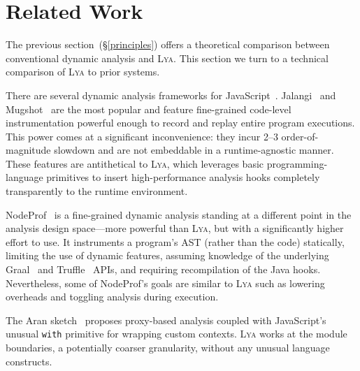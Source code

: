 \documentclass[letterpaper,twocolumn,10pt]{article}
\newcommand{\heading}[1]{\vspace{2pt}\noindent\textbf{#1}\enspace}
\newcommand{\ttt}[1]{\texttt{#1}}
\newcommand{\sx}[1]{(\S\ref{#1})}
\newcommand{\sys}{{\scshape Lya}\xspace}
\begin{document}
\section{Related Work}
\label{rw}

The previous section~\sx{principles} offers a theoretical comparison between conventional dynamic analysis and \sys.
This section we turn to a technical comparison of \sys to prior systems.

There are several dynamic analysis frameworks for JavaScript~\cite{javascript1, javascript2, javascript3, mugshot, jalangi}.
Jalangi~\cite{jalangi} and Mugshot~\cite{mugshot} are the most popular and feature fine-grained code-level instrumentation powerful enough to record and replay entire program executions.
This power comes at a significant inconvenience: %
  they incur 2--3 order-of-magnitude slowdown and are not embeddable in a runtime-agnostic manner.
These features are antithetical to \sys, which leverages basic programming-language primitives to insert high-performance analysis hooks completely transparently to the runtime environment.

NodeProf~\cite{javascript3} is a fine-grained dynamic analysis %
  standing at a different point in the analysis design space---more powerful than \sys, but with a significantly higher effort to use.
It instruments a program's AST (rather than the code) statically, %
  limiting the use of dynamic features, assuming knowledge of the underlying Graal~\cite{graal} and Truffle~\cite{truffle} APIs, and requiring recompilation of the Java hooks.
Nevertheless, some of NodeProf's goals are similar to \sys such as lowering overheads and toggling analysis during execution.

The Aran sketch~\cite{javascript1} proposes proxy-based analysis coupled with JavaScript's unusual \ttt{with} primitive for wrapping custom contexts.
\sys works at the module boundaries, a potentially coarser granularity, without any unusual language constructs.
\end{document}
